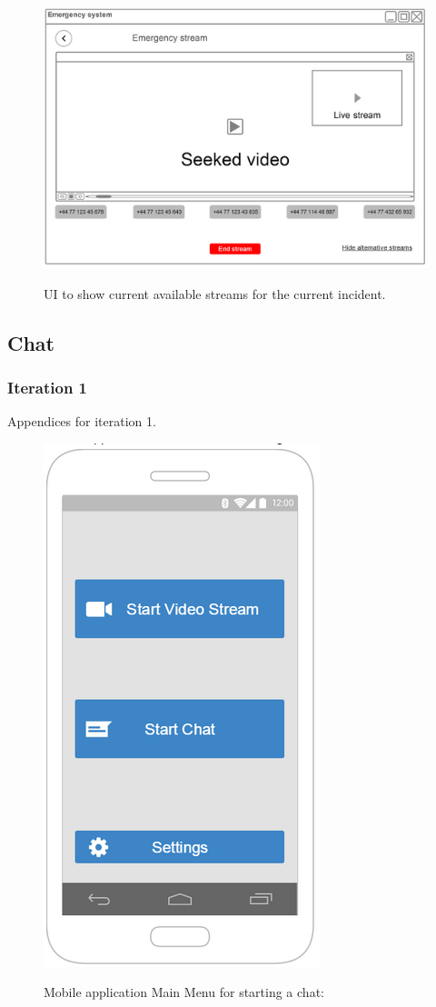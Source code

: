 \documentclass{article}
\begin{document}
    
	
	\begin{figure}[h]
		\centering
	\vspace{-5pt}
		\includegraphics[width=.8\textwidth]{"VideoStream/22"}

		UI to show current available streams for the current incident.
	\vspace{-60pt}
	\end{figure}
	\pagebreak
	\clearpage
	
	





	
    \subsection{Chat}
    \subsubsection{Iteration 1} Appendices for iteration 1.
    
	\begin{figure}[h]
		\centering
		\includegraphics[width=.5\textwidth]{"Chat/1"}

  Mobile application Main Menu for starting a chat:
	\end{figure} \clearpage
	
\end{document}
